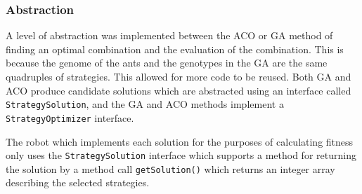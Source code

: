 

\subsubsection{Abstraction}
A level of abstraction was implemented between the ACO or GA method of finding an optimal combination and the evaluation of the combination. This is because the genome of the ants and the genotypes in the GA are the same quadruples of strategies. This allowed for more code to be reused. Both GA and ACO produce candidate solutions which are abstracted using an interface called \texttt{StrategySolution}, and the GA and ACO methods implement a \texttt{StrategyOptimizer} interface.

The robot which implements each solution for the purposes of calculating fitness only uses the \texttt{StrategySolution} interface which supports a method for returning the solution by a method call \texttt{getSolution()} which returns an integer array describing the selected strategies.
